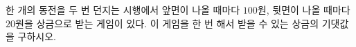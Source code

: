 한 개의 동전을 두 번 던지는 시행에서 앞면이 나올 때마다 $100$원, 뒷면이 나올 때마다 $20$원을 상금으로 받는 게임이 있다. 이 게임을 한 번 해서 받을 수 있는 상금의 기댓값을 구하시오.
